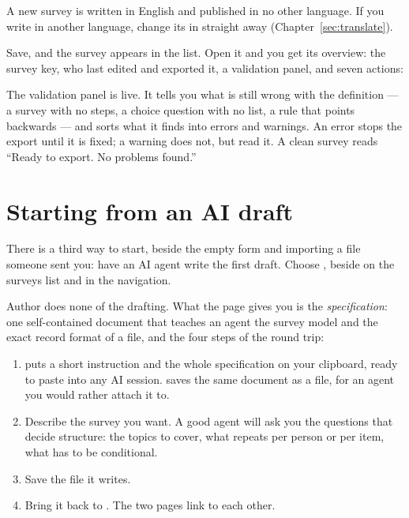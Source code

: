 \documentclass[11pt, a4paper]{article}
\begin{document}
A new survey is written in English and published in no other language. If you write in another
language, change its  in  straight away
(Chapter~\ref{sec:translate}).

Save, and the survey appears in the list. Open it and you get its overview: the survey key, who
last edited and exported it, a validation panel, and seven actions:

\begin{center}\small
{} \quad {} \quad {} \quad {} \quad
{} \quad {} \quad {}
\end{center}


The validation panel is live. It tells you what is still wrong with the definition — a survey
with no steps, a choice question with no list, a rule that points backwards — and sorts what it
finds into errors and warnings. An error stops the export until it is fixed; a warning does not,
but read it. A clean survey reads “Ready to export. No problems found.”

\section{Starting from an AI draft}
\label{sec:ai}

There is a third way to start, beside the empty form and importing a file someone sent you: have
an AI agent write the first draft. Choose , beside  on the
surveys list and in the navigation.

Author does none of the drafting. What the page gives you is the \emph{specification}: one
self-contained document that teaches an agent the survey model and the exact record format of a
 file, and the four steps of the round trip:

\begin{enumerate}
  \item {} puts a short instruction and the whole specification on
        your clipboard, ready to paste into any AI session. 
        saves the same document as a file, for an agent you would rather attach it to.
  \item Describe the survey you want. A good agent will ask you the questions that decide
        structure: the topics to cover, what repeats per person or per item, what has to be
        conditional.
  \item Save the  file it writes.
  \item Bring it back to . The two pages link to each other.
\end{enumerate}
\end{document}
